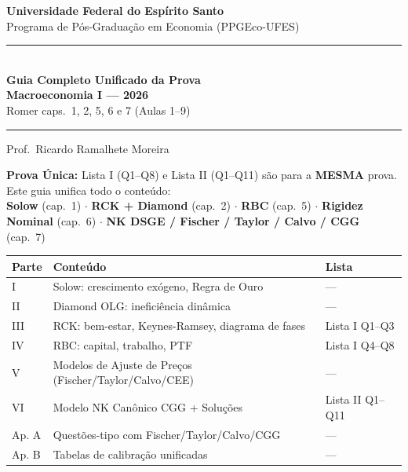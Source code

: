 \documentclass[12pt, a4paper]{article}
\begin{document}

\begin{titlepage}
\begin{center}
\vspace*{1.5cm}
{\Large\bfseries Universidade Federal do Espírito Santo}\\[0.5em]
{\large Programa de Pós-Graduação em Economia (PPGEco-UFES)}\\[2em]

\rule{\linewidth}{1.2pt}\\[0.8em]
{\LARGE\bfseries\color{cyanrbc} Guia Completo Unificado da Prova\\[0.4em]
\large Macroeconomia I --- 2026}\\[0.4em]
{\normalsize\color{grayrbc} Romer caps.\ 1, 2, 5, 6 e 7 (Aulas 1--9)}\\[0.8em]
\rule{\linewidth}{1.2pt}

\vspace{1em}
{\large Prof.\ Ricardo Ramalhete Moreira}

\vspace{1.5em}
\begin{tcolorbox}[standard, colback=provabg, colframe=provaborder, width=0.92\textwidth,
  arc=4pt, boxrule=1.2pt, left=8pt, right=8pt, top=6pt, bottom=6pt]
\centering
\textbf{\textcolor{provaborder}{Prova Única:}} Lista I (Q1--Q8) e Lista II (Q1--Q11) são para a
\textbf{MESMA} prova. Este guia unifica todo o conteúdo:\\[0.4em]
\textbf{Solow} (cap.\ 1) $\cdot$ \textbf{RCK + Diamond} (cap.\ 2) $\cdot$ \textbf{RBC} (cap.\ 5)
$\cdot$ \textbf{Rigidez Nominal} (cap.\ 6) $\cdot$ \textbf{NK DSGE / Fischer / Taylor / Calvo / CGG} (cap.\ 7)
\end{tcolorbox}

\vspace{1.2em}
\begin{tabular}{lll}
\toprule
\textbf{Parte} & \textbf{Conteúdo} & \textbf{Lista} \\
\midrule
I & Solow: crescimento exógeno, Regra de Ouro & --- \\
II & Diamond OLG: ineficiência dinâmica & --- \\
III & RCK: bem-estar, Keynes-Ramsey, diagrama de fases & Lista I Q1--Q3 \\
IV & RBC: capital, trabalho, PTF & Lista I Q4--Q8 \\
V & Modelos de Ajuste de Preços (Fischer/Taylor/Calvo/CEE) & --- \\
VI & Modelo NK Canônico CGG + Soluções & Lista II Q1--Q11 \\
Ap. A & Questões-tipo com Fischer/Taylor/Calvo/CGG & --- \\
Ap. B & Tabelas de calibração unificadas & --- \\
\bottomrule
\end{tabular}


\end{center}
\end{titlepage}
\end{document}

